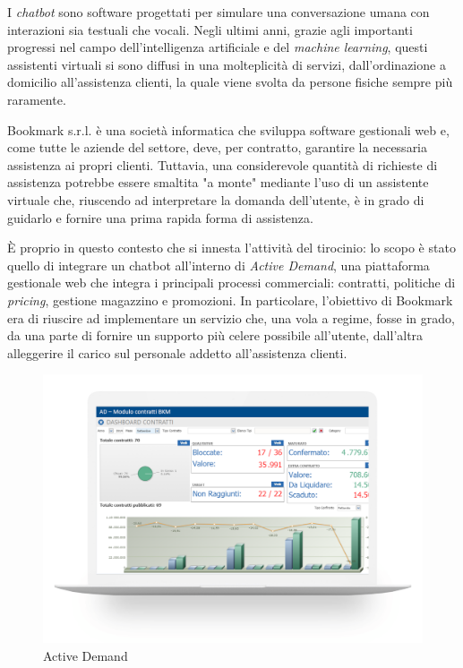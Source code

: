I \textit{chatbot} sono software progettati per simulare una conversazione umana con interazioni sia testuali che vocali.
%
Negli ultimi anni, grazie agli importanti progressi nel campo dell'intelligenza artificiale e del \textit{machine learning}, questi assistenti virtuali si sono diffusi in una molteplicità di servizi, dall'ordinazione a domicilio all'assistenza clienti, la quale viene svolta da persone fisiche sempre più raramente.

Bookmark s.r.l. è una società informatica che sviluppa software gestionali web e, come tutte le aziende del settore, deve, per contratto, garantire la necessaria assistenza ai propri clienti. 
%
Tuttavia, una considerevole quantità di richieste di assistenza potrebbe essere smaltita "a monte" mediante l'uso di un assistente virtuale che, riuscendo ad interpretare la domanda dell'utente, è in grado di guidarlo e fornire una prima rapida forma di assistenza.

\`E proprio in questo contesto che si innesta l'attività del tirocinio: lo scopo è stato quello di integrare un chatbot all'interno di \textit{Active Demand}, una piattaforma gestionale web che integra i principali processi commerciali: contratti, politiche di \textit{pricing}, gestione magazzino e promozioni.
%
In particolare, l'obiettivo di Bookmark era di riuscire ad implementare un servizio che, una vola a regime, fosse in grado, da una parte di fornire un supporto più celere possibile all'utente, dall'altra alleggerire il carico sul personale addetto all'assistenza clienti.

\begin{figure}
    \centering{}
    \includegraphics*[width=\textwidth]{./img/ad.png}
    \caption{Active Demand}
    \label{img:ad}
\end{figure}

